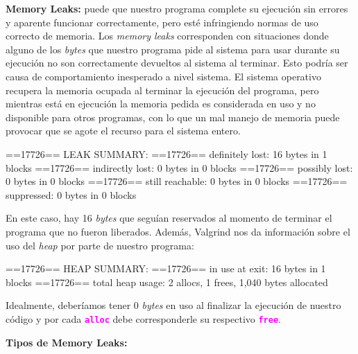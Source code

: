 \documentclass[]{scrartcl}
\newcommand{\hl}[1]{\textcolor{magenta}{\textbf{\texttt{#1}}}}
\begin{document}
\textbf{Memory Leaks:} puede que nuestro programa complete su ejecución sin errores y aparente funcionar correctamente, pero esté infringiendo normas de uso correcto de memoria. Los \textit{memory leaks} corresponden con situaciones donde alguno de los \textit{bytes} que nuestro programa pide al sistema para usar durante su ejecución no son correctamente devueltos al sistema al terminar. Esto podría ser causa de comportamiento inesperado a nivel sistema. El sistema operativo recupera la memoria ocupada al terminar la ejecución del programa, pero mientras está en ejecución la memoria pedida es considerada en uso y no disponible para otros programas, con lo que un mal manejo de memoria puede provocar que se agote el recurso para el sistema entero.
\begin{bashbox}[]
  ==17726== LEAK SUMMARY:
  ==17726==    definitely lost: 16 bytes in 1 blocks
  ==17726==    indirectly lost: 0 bytes in 0 blocks
  ==17726==      possibly lost: 0 bytes in 0 blocks
  ==17726==    still reachable: 0 bytes in 0 blocks
  ==17726==         suppressed: 0 bytes in 0 blocks
\end{bashbox}

En este caso, hay 16 \textit{bytes} que seguían reservados al momento de terminar el programa que no fueron liberados. Además, Valgrind nos da información sobre el uso del \textit{heap} por parte de nuestro programa:

\begin{bashbox}[]
  ==17726== HEAP SUMMARY:
  ==17726==     in use at exit: 16 bytes in 1 blocks
  ==17726==   total heap usage: 2 allocs, 1 frees, 1,040 bytes allocated
\end{bashbox}

Idealmente, deberíamos tener 0 \textit{bytes} en uso al finalizar la ejecución de nuestro código y por cada \hl{alloc} debe corresponderle su respectivo \hl{free}.

\textbf{Tipos de Memory Leaks:} 
\end{document}
